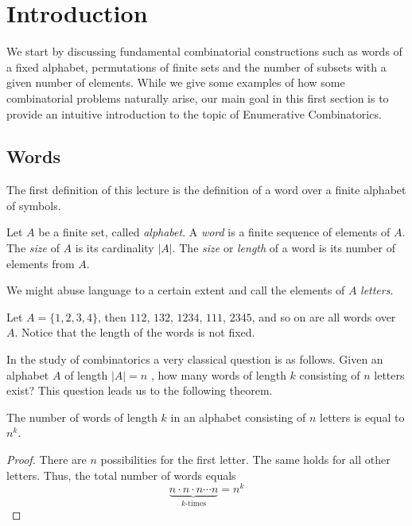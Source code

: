 \section{Introduction}\label{introduction} 

We start by discussing fundamental combinatorial constructions such as words of a fixed alphabet, permutations of finite
sets and the number of subsets with a given number of elements. While we give some examples of how some combinatorial problems 
naturally arise, our main goal in this first section is to provide an intuitive introduction to the topic of 
Enumerative Combinatorics. 

\subsection{Words}

The first definition of this lecture is the definition of a word over a finite alphabet of symbols.

\begin{defn}[word]
Let $A$ be a finite set, called \textit{alphabet}. A \textit{word} is a finite sequence of elements of $A$. The \textit{size} of $A$ is its cardinality $|A|$.
The \textit{size} or \textit{length} of a word is its number of elements from $A$.
\end{defn}
\noindent
We might abuse language to a certain extent and call the elements of $A$ \textit{letters}.

\begin{exmp}
Let $A=\{1, 2, 3, 4\}$, then $112$, $132$, $1234$, $111$, $2345$, and so on are all words over $A$.
Notice that the length of the words is not fixed.    
\end{exmp}

In the study of combinatorics a very classical question is as follows. Given an alphabet $A$ of length $|A|=n$ , how many words of length $k$ consisting of $n$
letters exist? This question leads us to the following theorem.

\begin{theorem}
The number of words of length $k$ in an alphabet consisting of $n$ letters is equal to $n^k$.
\label{thmNumWords}
\end{theorem}
\begin{proof}
There are $n$ possibilities for the first letter. The same holds for all other letters.
Thus, the total number of words equals
$$
\underbrace{n \cdot n \cdot n \cdots n}_\text{$k$-times} = n^k
$$
\end{proof}

